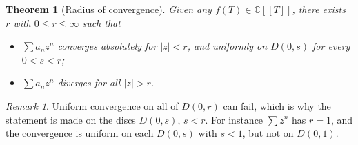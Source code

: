 \documentclass[11pt]{article}
\theoremstyle{plain}
\newtheorem{theorem}{Theorem}[section]
\theoremstyle{definition}
\theoremstyle{remark}
\newtheorem*{remark}{Remark}
\numberwithin{equation}{section}
\newcommand{\be}{\begin{eqnarray}}
\newcommand{\ee}{\end{eqnarray}}
\newcommand{\C}{\mathbb{C}}
\newcommand{\CT}{\C[[T]]}
\begin{document}
\begin{theorem}[Radius of convergence]
\label{thm:radius}
Given any $f(T)\in\CT$, there exists $r$ with $0\le r\le\infty$ such that
\begin{itemize}
\item $\sum a_nz^n$ converges absolutely for $|z|<r$, and uniformly on
$D(0,s)$ for every $0<s<r$;
\item $\sum a_nz^n$ diverges for all $|z|>r$.
\end{itemize}
\end{theorem}
%
%
%
%
%
%
%




\begin{remark}
Uniform convergence on all of $D(0,r)$ can fail, which is why the statement
is made on the discs $D(0,s)$, $s<r$. For instance $\sum z^n$ has $r=1$, and
the convergence is uniform on each $D(0,s)$ with $s<1$, but not on $D(0,1)$.
\end{remark}
\end{document}
